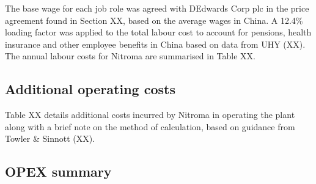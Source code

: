 The base wage for each job role was agreed with DEdwards Corp plc in the price agreement found in Section XX, based on the average wages in China. A 12.4\% loading factor was applied to the total labour cost to account for pensions, health insurance and other employee benefits in China based on data from UHY (XX). The annual labour costs for Nitroma are summarised in Table XX.

\subsection{Additional operating costs}
Table XX details additional costs incurred by Nitroma in operating the plant along with a brief note on the method of calculation, based on guidance from Towler \& Sinnott (XX).

\subsection{OPEX summary}